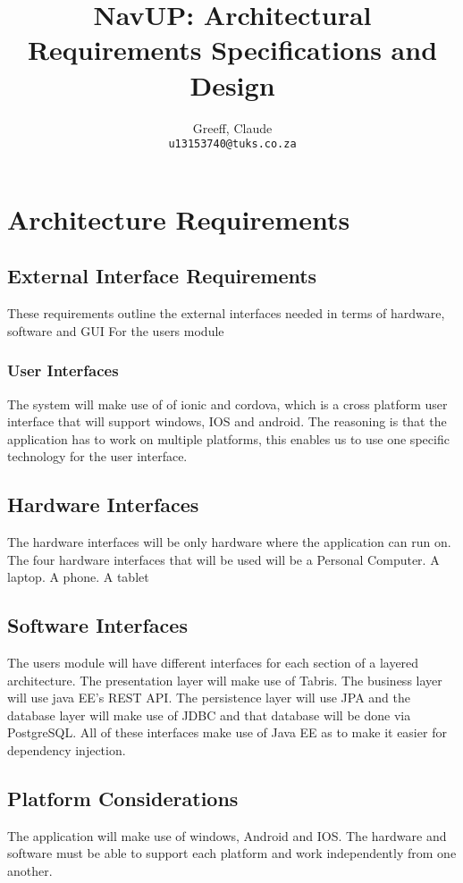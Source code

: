 \documentclass{article}
\title{NavUP: Architectural Requirements Specifications and Design}
\author{	 
	Greeff, Claude\\
	\texttt{u13153740@tuks.co.za}
	\and	
}
\begin{document}
	\maketitle
	\section{Architecture Requirements}
		\subsection{External Interface Requirements}
These requirements outline the external interfaces needed in terms of hardware, software and GUI For the users module
		 
		 \subsubsection{User Interfaces}
The system will make use of of  ionic and cordova, which is a cross platform user interface that will support windows, IOS and android. The reasoning is that the application has to work on multiple platforms, this enables us to use one specific technology for the user interface.
		\subsection{Hardware Interfaces}
		The hardware interfaces will be only hardware where the application can run on. The four hardware interfaces that will be used will be a Personal Computer. A laptop. A phone. A tablet 
		\subsection{Software Interfaces}
		The users module will have different interfaces for each section of a layered architecture. The presentation layer will make use of Tabris. The business layer will use java EE's REST API.  The persistence layer will use JPA and the database layer will make use of JDBC and that database will be done via PostgreSQL. All of these interfaces make use of Java EE as to make it easier for dependency injection.
		\subsection{Platform Considerations}
		The application will make use of windows, Android and IOS. The hardware and software must be able to support each platform and work independently from one another.
		


 		
	
\end{document}
